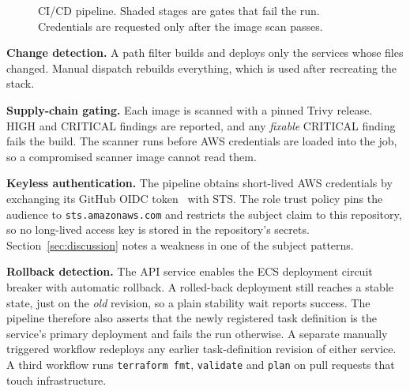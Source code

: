 \documentclass[conference]{IEEEtran}
\begin{document}
\begin{figure}[t]
\centering
{}
\caption{CI/CD pipeline. Shaded stages are gates that fail the run. Credentials are requested only after the image scan passes.}
\label{fig:pipeline}
\end{figure}

\textbf{Change detection.} A path filter builds and deploys only the services whose files changed. Manual dispatch rebuilds everything, which is used after recreating the stack.

\textbf{Supply-chain gating.} Each image is scanned with a pinned Trivy release. HIGH and CRITICAL findings are reported, and any \emph{fixable} CRITICAL finding fails the build. The scanner runs before AWS credentials are loaded into the job, so a compromised scanner image cannot read them.

\textbf{Keyless authentication.} The pipeline obtains short-lived AWS credentials by exchanging its GitHub OIDC token~\cite{oidc_core} with STS. The role trust policy pins the audience to \texttt{sts.amazonaws.com} and restricts the subject claim to this repository, so no long-lived access key is stored in the repository's secrets. Section~\ref{sec:discussion} notes a weakness in one of the subject patterns.

\textbf{Rollback detection.} The API service enables the ECS deployment circuit breaker with automatic rollback. A rolled-back deployment still reaches a stable state, just on the \emph{old} revision, so a plain stability wait reports success. The pipeline therefore also asserts that the newly registered task definition is the service's primary deployment and fails the run otherwise. A separate manually triggered workflow redeploys any earlier task-definition revision of either service. A third workflow runs \texttt{terraform fmt}, \texttt{validate} and \texttt{plan} on pull requests that touch infrastructure.
\end{document}
